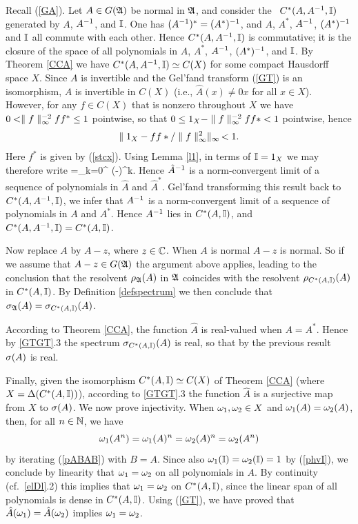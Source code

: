 Recall (\ref{GA}). Let $A\in G({\frak A})$ be normal in ${\frak A}$, and consider
the \ca\ $C^*(A,A^{-1},{\Bbb I})$ generated by $A$, $A^{-1}$, and ${\Bbb I}$. One
has $(A^{-1})^*=(A^*)^{-1}$, and $A$, $A^*$, $A^{-1}$, $(A^*)^{-1}$ and
${\Bbb I}$ all commute with each other. Hence $C^*(A,A^{-1},{\Bbb I})$ is
commutative; it is the closure of the space of all polynomials in $A$,
$A^*$, $A^{-1}$, $(A^*)^{-1}$, and ${\Bbb I}$. By Theorem \ref{CCA} we have
$C^*(A,A^{-1},{\Bbb I})\simeq C(X)$ for some compact Hausdorff space $X$.
Since $A$ is invertible and the Gel'fand transform (\ref{GT}) is an
isomorphism, $\hat{A}$ is invertible in $C(X)$ (i.e., $\hat{A}(x)\neq
0x$ for all $x\in X$).  However, for any $f\in C(X)$ that is nonzero
throughout $X$ we have $0< \parallel f\parallel_{\infty}^{-2}ff^*\leq 1$ pointwise,
so that $0\leq 1_X- \parallel f\parallel_{\infty}^{-2}ff* < 1$ pointwise, hence
$$
\parallel 1_X- ff*/\parallel f\parallel_{\infty}^2\parallel_{\infty}\,<1.
$$
Here $f^*$ is given by (\ref{stcx}).  Using Lemma \ref{l1}, in terms
of ${\Bbb I}=1_X$ we may therefore write \be {}=\sum_{k=0}^{\infty} \left(\I-\right)^k.  \ee Hence $\hat{A}^{-1}$ is a
norm-convergent limit of a sequence of polynomials in $\hat{A}$ and
$\hat{A}^*$. Gel'fand transforming this result back to
$C^*(A,A^{-1},{\Bbb I})$, we infer that $A^{-1}$ is a norm-convergent limit of
a sequence of polynomials in $A$ and $A^*$. Hence $A^{-1}$ lies in
$C^*(A,{\Bbb I})$, and $C^*(A,A^{-1},{\Bbb I})=C^*(A,{\Bbb I})$.

Now replace $A$ by $A-z$, where $z\in{\Bbb C}$. When $A$ is normal $A-z$ is
normal. So if we assume that $A-z\in G({\frak A})$ the argument above
applies, leading to the conclusion that the resolvent $\rho_{{\frak A}}(A)$ in
${\frak A}$ coincides with the resolvent $\rho_{C^*(A,{\Bbb I})}(A)$ in
$C^*(A,{\Bbb I})$. By Definition \ref{defspectrum} we then conclude that
$\sigma_{{\frak A}}(A)=\sigma_{C^*(A,{\Bbb I})}(A)$.

According to Theorem \ref{CCA}, the function $\hat{A}$ is real-valued
when $A=A^*$. Hence by \ref{GTGT}.3 the spectrum $\sigma_{C^*(A,{\Bbb I})}(A)$
is real, so that by the previous result $\sigma(A)$ is real.

Finally, given the isomorphism $C^*(A,{\Bbb I})\simeq C(X)$ of Theorem
\ref{CCA} (where $X=\Delta(C^*(A,{\Bbb I}))$), according to \ref{GTGT}.3 the
function $\hat{A}$ is a surjective map from $X$ to $\sigma(A)$.  We now
prove injectivity.  When $\omega_1,\omega_2\in X$ and $\omega_1(A)=\omega_2(A)$,
then, for all $n\in{\Bbb N}$, we have $$
\omega_1(A^n)=\omega_1(A)^n=\omega_2(A)^n=\omega_2(A^n)
$$
  by iterating (\ref{pABAB}) with $B=A$. Since also
$\omega_1({\Bbb I})=\omega_2({\Bbb I})=1$ by (\ref{phvI}), we conclude by linearity that
$\omega_1=\omega_2$ on all polynomials in $A$.  By continuity (cf.\
\ref{elDl}.2) this implies that $\omega_1=\omega_2$ on $C^*(A,{\Bbb I})$, since
the linear span of all polynomials is dense in $C^*(A,{\Bbb I})$.  Using
(\ref{GT}), we have proved that $\hat{A}(\omega_1)=\hat{A}(\omega_2)$
implies $\omega_1=\omega_2$.

